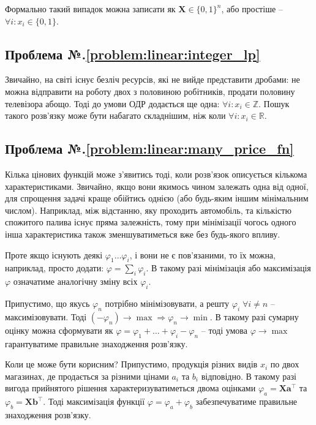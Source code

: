 \documentclass[\main/book.tex]{subfiles}
\begin{document}
\begin{note}
 Формально такий випадок можна записати як $\mathbf{X} \in \{0, 1\}^{n}$, або простіше -- $\forall i: x_i \in \{0, 1\}$.
\end{note}

\clearpage
{}

\subsection*{Проблема №.\ref{problem:linear:integer_lp}}

Звичайно, на світі існує безліч ресурсів, які не вийде представити дробами: не можна відправити на роботу двох з половиною робітників, продати половину телевізора абощо. Тоді до умови ОДР додається ще одна: $\forall i: x_i \in \mathbb{Z}$. Пошук такого розв'язку може бути набагато складнішим, ніж коли $\forall i: x_i \in \mathbb{R}$.

\subsection*{Проблема №.\ref{problem:linear:many_price_fn}}

Кілька цінових функцій може з'явитись тоді, коли розв'язок описується кількома характеристиками. Звичайно, якщо вони якимось чином залежать одна від одної, для спрощення задачі краще обійтись однією (або будь-яким іншим мінімальним числом). Наприклад, між відстанню, яку проходить автомобіль, та кількістю спожитого палива існує пряма залежність, тому при мінімізації чогось одного інша характеристика також зменшуватиметься вже без будь-якого впливу.

Проте якщо існують деякі $\varphi_1 \ldots \varphi_i$, і вони не є пов'язаними, то їх можна, наприклад, просто додати: $\varphi = \sum_i \varphi_i$. В такому разі мінімізація або максимізація $\varphi$ означатиме аналогічну зміну всіх $\varphi_i$.

Припустимо, що якусь $\varphi_n$ потрібно мінімізовувати, а решту $\varphi_i \; \forall {i \neq n}$ -- максимізовувати. Тоді $(-\varphi_n) \rightarrow \max \Rightarrow \varphi_n \rightarrow \min$. В такому разі сумарну оцінку можна сформувати як $\varphi = \varphi_1 + \ldots + \varphi_i - \varphi_n$ -- тоді умова $\varphi \rightarrow \max$ гарантуватиме правильне знаходження розв'язку.

Коли це може бути корисним? Припустимо, продукція різних видів $x_i$ по двох магазинах, де продається за різними цінами $a_i$ та $b_i$ відповідно. В такому разі \flqq{}вигода\frqq{} прийнятого рішення характеризуватиметься двома оцінками $\varphi_a = \mathbf{X} \mathbf{a}^\top$ та $\varphi_b = \mathbf{X} \mathbf{b}^\top$. Тоді максимізація функції $\varphi = \varphi_a + \varphi_b$ забезпечуватиме правильне знаходження розв'язку.
\end{document}
